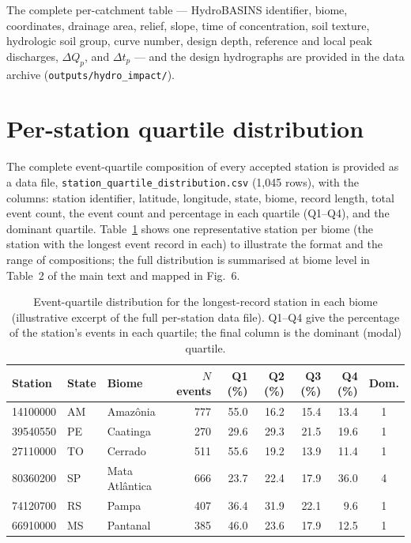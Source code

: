 \documentclass[11pt]{article}
\begin{document}
The complete per-catchment table — HydroBASINS identifier, biome,
coordinates, drainage area, relief, slope, time of concentration, soil
texture, hydrologic soil group, curve number, design depth, reference
and local peak discharges, $\Delta Q_p$, and $\Delta t_p$ — and the
design hydrographs are provided in the data archive
(\texttt{outputs/hydro\_impact/}).

\section{Per-station quartile distribution}
\label{sec:supp_quartile}

The complete event-quartile composition of every accepted station is
provided as a data file,
\texttt{station\_quartile\_distribution.csv} (1{,}045 rows), with the
columns: station identifier, latitude, longitude, state, biome, record
length, total event count, the event count and percentage in each
quartile (Q1--Q4), and the dominant quartile. Table~\ref{tab:supp_quartile}
shows one representative station per biome (the station with the longest
event record in each) to illustrate the format and the range of
compositions; the full distribution is summarised at biome level in
Table~2 of the main text and mapped in Fig.~6.

\begin{table}[h]
  \centering
  \caption{Event-quartile distribution for the longest-record station in
    each biome (illustrative excerpt of the full per-station data file).
    Q1--Q4 give the percentage of the station's events in each quartile;
    the final column is the dominant (modal) quartile.}
  \label{tab:supp_quartile}
  \small
  \setlength{\tabcolsep}{5pt}
  \begin{tabular}{lllrrrrrc}
    \toprule
    Station & State & Biome & $N$ events &
      Q1 (\%) & Q2 (\%) & Q3 (\%) & Q4 (\%) & Dom. \\
    \midrule
    14100000 & AM & Amaz\^onia       & 777 & 55.0 & 16.2 & 15.4 & 13.4 & 1 \\
    39540550 & PE & Caatinga         & 270 & 29.6 & 29.3 & 21.5 & 19.6 & 1 \\
    27110000 & TO & Cerrado          & 511 & 55.6 & 19.2 & 13.9 & 11.4 & 1 \\
    80360200 & SP & Mata Atl\^antica & 666 & 23.7 & 22.4 & 17.9 & 36.0 & 4 \\
    74120700 & RS & Pampa            & 407 & 36.4 & 31.9 & 22.1 &  9.6 & 1 \\
    66910000 & MS & Pantanal         & 385 & 46.0 & 23.6 & 17.9 & 12.5 & 1 \\
    \bottomrule
  \end{tabular}
\end{table}



\end{document}

